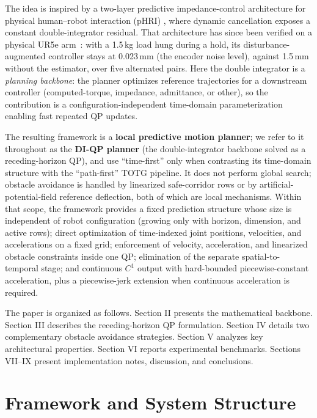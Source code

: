The idea is inspired by a two-layer predictive impedance-control
architecture for physical human--robot interaction (pHRI) \cite{phri},
where dynamic cancellation exposes a constant double-integrator residual. That architecture has since been verified on a physical UR5e arm~\cite{phri}: with a 1.5\,kg load hung during a hold, its disturbance-augmented controller stays at 0.023\,mm (the encoder noise level), against 1.5\,mm without the estimator, over five alternated pairs.
Here the double integrator is a \emph{planning backbone}: the planner
optimizes reference trajectories for a
downstream controller (computed-torque, impedance, admittance, or other), so
the contribution is a configuration-independent time-domain parameterization
enabling fast repeated QP updates.

The resulting framework is a \textbf{local
predictive motion planner}; we
refer to it throughout as the \textbf{DI-QP planner} (the double-integrator
backbone solved as a receding-horizon QP), and use ``time-first'' only
when contrasting its time-domain structure with the ``path-first'' TOTG
pipeline. It does not perform global search; obstacle avoidance is
handled by linearized safe-corridor rows or by artificial-potential-field
reference deflection, both of which are local mechanisms. Within that scope, 
the framework provides a fixed prediction structure
whose size is independent of robot configuration (growing only with
horizon, dimension, and active rows); direct optimization of time-indexed
joint positions, velocities, and accelerations on a fixed grid; enforcement
of velocity, acceleration, and linearized obstacle constraints inside one
QP; elimination of the separate spatial-to-temporal stage; and continuous
\(C^1\) output with hard-bounded piecewise-constant acceleration, plus a
piecewise-jerk extension when continuous acceleration is required.

The paper is organized as follows. Section II presents the mathematical
backbone. Section III describes the receding-horizon QP formulation.
Section IV details two complementary obstacle avoidance strategies.
Section V analyzes key architectural properties. Section VI reports
experimental benchmarks. Sections VII--IX present implementation notes,
discussion, and conclusions.

\section{Framework and System
Structure}\label{ii.-mathematical-framework-and-system-structure}

